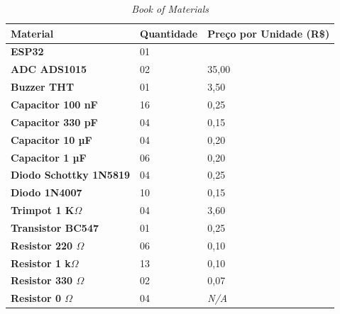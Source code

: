 \begin{table}[!ht]
    \centering
    \caption{\textit{Book of Materials}}
    \label{tab:Bookofmaterials}
    \begin{tabular}{|l|l|l|}
        \hline
        \textbf{Material}                      & \textbf{Quantidade} & \textbf{Preço por Unidade (R\$)} \\ \hline
        \textbf{ESP32}                         & 01                  &                                  \\ \hline
        \textbf{ADC ADS1015}                   & 02                  & 35,00                            \\ \hline
        \textbf{Buzzer THT}                    & 01                  & 3,50                             \\ \hline
        \textbf{Capacitor 100 nF}              & 16                  & 0,25                             \\ \hline
        \textbf{Capacitor 330 pF}              & 04                  & 0,15                             \\ \hline
        \textbf{Capacitor 10 µF}               & 04                  & 0,20                             \\ \hline
        \textbf{Capacitor 1 µF}                & 06                  & 0,20                             \\ \hline
        \textbf{Diodo Schottky 1N5819}         & 04                  & 0,25                             \\ \hline
        \textbf{Diodo 1N4007}                  & 10                  & 0,15                             \\ \hline
        \textbf{Trimpot 1 K$\Omega$}           & 04                  & 3,60                             \\ \hline
        \textbf{Transistor BC547}              & 01                  & 0,25                             \\ \hline
        \textbf{Resistor 220 $\Omega$}         & 06                  & 0,10                             \\ \hline
        \textbf{Resistor 1 k$\Omega$}          & 13                  & 0,10                             \\ \hline
        \textbf{Resistor 330 $\Omega$}         & 02                  & 0,07                             \\ \hline
        \textbf{Resistor 0 $\Omega$}           & 04                  & \textit{N/A}                     \\ \hline

\end{tabular}
\end{table}
